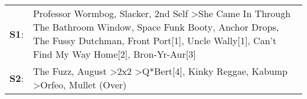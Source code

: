 \begin{supertabular}{p{0.03\textwidth}p{0.92\textwidth}}
 \textbf{S1}:  &  Professor Wormbog\textsuperscript{}, \enspace Slacker\textsuperscript{}, \enspace 2nd Self\textsuperscript{} \textgreater \enspace She Came In Through The Bathroom Window\textsuperscript{}, \enspace Space Funk Booty\textsuperscript{}, \enspace Anchor Drops\textsuperscript{}, \enspace The Fussy Dutchman\textsuperscript{}, \enspace Front Port[1]\textsuperscript{}, \enspace Uncle Wally[1]\textsuperscript{}, \enspace Can't Find My Way Home[2]\textsuperscript{}, \enspace Bron-Yr-Aur[3]\textsuperscript{}  \enspace  \\
 \textbf{S2}:  &                                                                                                                                                                                          The Fuzz\textsuperscript{}, \enspace August\textsuperscript{} \textgreater \enspace 2x2\textsuperscript{} \textgreater \enspace Q*Bert[4]\textsuperscript{}, \enspace Kinky Reggae\textsuperscript{}, \enspace Kabump\textsuperscript{} \textgreater \enspace Orfeo\textsuperscript{}, \enspace Mullet (Over)\textsuperscript{}  \enspace  \\
\end{supertabular}
